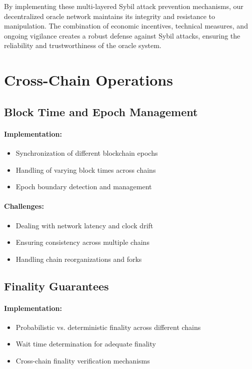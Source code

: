 \documentclass[12pt,a4paper]{article}
\begin{document}
	By implementing these multi-layered Sybil attack prevention mechanisms, our decentralized oracle network maintains its integrity and resistance to manipulation. The combination of economic incentives, technical measures, and ongoing vigilance creates a robust defense against Sybil attacks, ensuring the reliability and trustworthiness of the oracle system.

	\section{Cross-Chain Operations}
	
	\subsection{Block Time and Epoch Management}
	\paragraph{Implementation:}
	\begin{itemize}
		\item Synchronization of different blockchain epochs
		\item Handling of varying block times across chains
		\item Epoch boundary detection and management
	\end{itemize}
	
	\paragraph{Challenges:}
	\begin{itemize}
		\item Dealing with network latency and clock drift
		\item Ensuring consistency across multiple chains
		\item Handling chain reorganizations and forks
	\end{itemize}
	
	\subsection{Finality Guarantees}
	\paragraph{Implementation:}
	\begin{itemize}
		\item Probabilistic vs. deterministic finality across different chains
		\item Wait time determination for adequate finality
		\item Cross-chain finality verification mechanisms
	\end{itemize}
	
\end{document}
